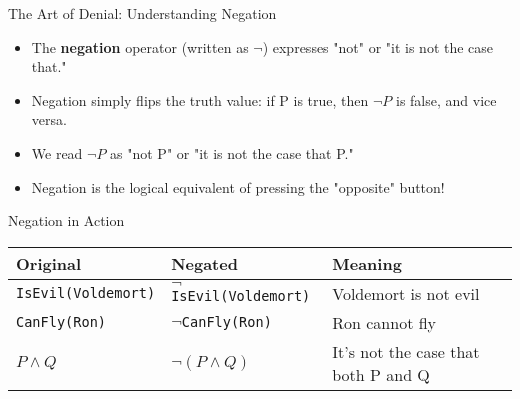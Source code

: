 \documentclass{beamer}
\begin{document}
	\begin{frame}{The Art of Denial: Understanding Negation}
		\begin{itemize}
			\item The \textbf{negation} operator (written as $\neg$) expresses "not" or "it is not the case that."
			\item Negation simply flips the truth value: if P is true, then $\neg P$ is false, and vice versa.
			\item We read $\neg P$ as "not P" or "it is not the case that P."
			\item Negation is the logical equivalent of pressing the "opposite" button!
		\end{itemize}
		
		\begin{alertblock}{Negation in Action}
			\begin{table}
				\scriptsize
				\centering
				\begin{tabular}{|l|l|l|}
					\hline
					\textbf{Original} & \textbf{Negated} & \textbf{Meaning} \\
					\hline
					\texttt{IsEvil(Voldemort)} & $\neg$\texttt{IsEvil(Voldemort)} & Voldemort is not evil \\
					\texttt{CanFly(Ron)} & $\neg$\texttt{CanFly(Ron)} & Ron cannot fly \\
					$P \land Q$ & $\neg(P \land Q)$ & It's not the case that both P and Q \\
					\hline
				\end{tabular}
			\end{table}
		\end{alertblock}
	\end{frame}
	
\end{document}
